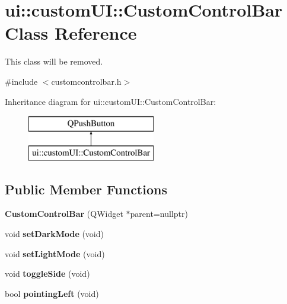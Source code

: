 \hypertarget{classui_1_1custom_u_i_1_1_custom_control_bar}{}\section{ui\+:\+:custom\+UI\+:\+:Custom\+Control\+Bar Class Reference}
\label{classui_1_1custom_u_i_1_1_custom_control_bar}


This class will be removed.  




{\ttfamily \#include $<$customcontrolbar.\+h$>$}

Inheritance diagram for ui\+:\+:custom\+UI\+:\+:Custom\+Control\+Bar\+:\begin{figure}[H]
\begin{center}
\leavevmode
\includegraphics[height=2.000000cm]{classui_1_1custom_u_i_1_1_custom_control_bar}
\end{center}
\end{figure}
\subsection*{Public Member Functions}
\begin{DoxyCompactItemize}
\item 
\mbox{\label{classui_1_1custom_u_i_1_1_custom_control_bar_a9329f07f4c566ad4427898976a7c54e9}} 
{\bfseries Custom\+Control\+Bar} (Q\+Widget $\ast$parent=nullptr)
\item 
\mbox{\label{classui_1_1custom_u_i_1_1_custom_control_bar_a06869826febedb072e3563b67233c1a6}} 
void {\bfseries set\+Dark\+Mode} (void)
\item 
\mbox{\label{classui_1_1custom_u_i_1_1_custom_control_bar_ad144dfcd0631cf953f6835f725d8fb22}} 
void {\bfseries set\+Light\+Mode} (void)
\item 
\mbox{\label{classui_1_1custom_u_i_1_1_custom_control_bar_ad866a00b234d58ea00f485590a939e12}} 
void {\bfseries toggle\+Side} (void)
\item 
\mbox{\label{classui_1_1custom_u_i_1_1_custom_control_bar_ab5d80c519c4c0675cc2b1de53a83ba27}} 
bool {\bfseries pointing\+Left} (void)
\end{DoxyCompactItemize}
